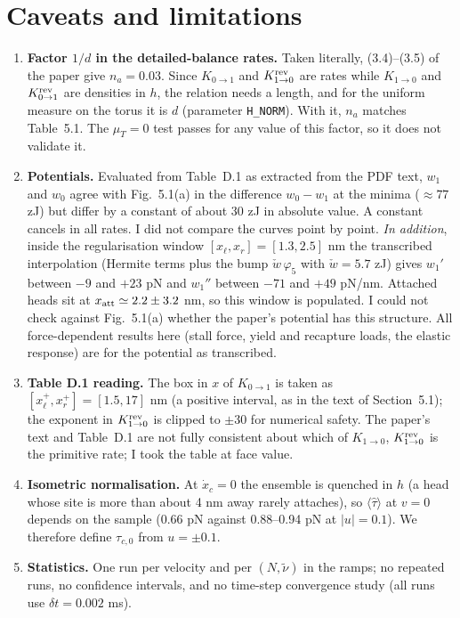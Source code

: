 \documentclass[11pt,a4paper]{article}
\newcommand{\tauz}{\tau_{c,0}}
\begin{document}
\section{Caveats and limitations}
\label{sec:caveats}
\begin{enumerate}
\item \textbf{Factor $1/d$ in the detailed-balance rates.} Taken literally, (3.4)--(3.5) of the paper give $n_a=0.03$. Since $K_{0\to1}$ and $K^{\rm rev}_{1\to0}$ are rates while $K_{1\to0}$ and $K^{\rm rev}_{0\to1}$ are densities in $h$, the relation needs a length, and for the uniform measure on the torus it is $d$ (parameter \texttt{H\_NORM}). With it, $n_a$ matches Table~5.1. The $\mu_T=0$ test passes for any value of this factor, so it does not validate it.
\item \textbf{Potentials.} Evaluated from Table~D.1 as extracted from the PDF text, $w_1$ and $w_0$ agree with Fig.~5.1(a) in the difference $w_0-w_1$ at the minima ($\approx77$ zJ) but differ by a constant of about 30 zJ in absolute value. A constant cancels in all rates. I did not compare the curves point by point. \emph{In addition}, inside the regularisation window $[x_\ell,x_r]=[1.3,2.5]$ nm the transcribed interpolation (Hermite terms plus the bump $\check w\,\varphi_5$ with $\check w=5.7$ zJ) gives $w_1'$ between $-9$ and $+23$ pN and $w_1''$ between $-71$ and $+49$ pN/nm. Attached heads sit at $x_{\rm att}\simeq2.2\pm3.2$ nm, so this window is populated. I could not check against Fig.~5.1(a) whether the paper's potential has this structure. All force-dependent results here (stall force, yield and recapture loads, the elastic response) are for the potential as transcribed.
\item \textbf{Table D.1 reading.} The box in $x$ of $K_{0\to1}$ is taken as $[x^+_\ell,x^+_r]=[1.5,17]$ nm (a positive interval, as in the text of Section~5.1); the exponent in $K^{\rm rev}_{1\to0}$ is clipped to $\pm30$ for numerical safety. The paper's text and Table~D.1 are not fully consistent about which of $K_{1\to0}$, $K^{\rm rev}_{1\to0}$ is the primitive rate; I took the table at face value.
\item \textbf{Isometric normalisation.} At $\dot x_c=0$ the ensemble is quenched in $h$ (a head whose site is more than about 4 nm away rarely attaches), so $\langle\hat\tau\rangle$ at $v=0$ depends on the sample (0.66 pN against 0.88--0.94 pN at $|u|=0.1$). We therefore define $\tauz$ from $u=\pm0.1$.
\item \textbf{Statistics.} One run per velocity and per $(N,\tilde\nu)$ in the ramps; no repeated runs, no confidence intervals, and no time-step convergence study (all runs use $\delta t=0.002$ ms).

\end{enumerate}
\end{document}
